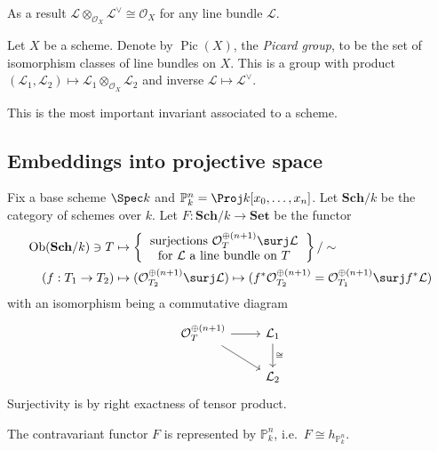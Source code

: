 \documentclass[a4paper]{article}
\renewcommand*{\P}{\mathbb{P}}
\renewcommand{\c}[1]{\mathbf{#1}} %
\newcommand{\sh}[1]{\mathcal{#1}} %
\DeclareMathOperator{\Pic}{Pic} %
\begin{document}
\begin{remark}
  As a result \(\sh L \otimes_{\sh O_X} \sh L^\vee \cong \sh O_X\) for any line bundle \(\sh L\).
\end{remark}

\begin{definition}
  Let \(X\) be a scheme. Denote by \(\Pic(X)\), the \emph{Picard group}, to be the set of isomorphism classes of line bundles on \(X\). This is a group with product \((\sh L_1, \sh L_2) \mapsto \sh L_1 \otimes_{\sh O_X} \sh L_2\) and inverse \(\sh L \mapsto \sh L^\vee\).
\end{definition}

This is the most important invariant associated to a scheme.

\subsection{Embeddings into projective space}

Fix a base scheme \(\Spec k\) and \(\P_k^n = \Proj k[x_0, \dots, x_n]\). Let \(\c{Sch}/k\) be the category of schemes over \(k\). Let \(F: \c{Sch}/k \to \c{Set}\) be the functor
\begin{align*}
  \mathrm{Ob}(\c{Sch}/k) \ni T &\mapsto
                        \left\{
                        \begin{tabular}{c}
                          surjections \(\sh O_T^{\oplus(n + 1)} \surj \sh L\) \\
                          for \(\sh L\) a line bundle on \(T\)
                        \end{tabular}
  \right\}/\sim \\
  (f: T_1 \to T_2) &\mapsto (\sh O_{T_2}^{\oplus(n + 1)} \surj \sh L) \mapsto (f^* \sh O_{T_2}^{\oplus (n + 1)} = \sh O_{T_1}^{\oplus (n + 1)} \surj f^* \sh L)
\end{align*}
with an isomorphism being a commutative diagram
\[
  \begin{tikzcd}
    \sh O_T^{\oplus(n + 1)} \ar[r] \ar[dr] & \sh L_1 \ar[d, "\cong"] \\
    & \sh L_2
  \end{tikzcd}
\]
Surjectivity is by right exactness of tensor product.

\begin{theorem}
  The contravariant functor \(F\) is represented by \(\P_k^n\), i.e.\ \(F \cong h_{\P^n_k}\).
\end{theorem}
\end{document}

